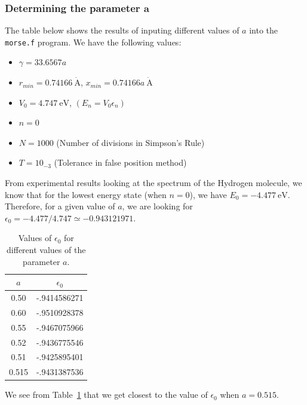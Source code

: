 \documentclass[a4paper]{IEEEtran}
\begin{document}
      \subsubsection{Determining the parameter $\mathbf{a}$}
      The table below shows the results of inputing different values of
      $a$ into the \verb+morse.f+ program. We have the following values:
      \begin{itemize}
            \item $\gamma = 33.6567a$
            \item $r_{min} = 0.74166 \: \mathrm{\dot{A}}$, 
                  $x_{min} = 0.74166a \: \mathrm{\dot{A}}$
            \item $V_0 = 4.747 \: \mathrm{eV}$, $(E_n = V_0\epsilon_n)$
            \item $n = 0$
            \item $N = 1000$ (Number of divisions in Simpson's Rule)
            \item $T = 10_{-3}$ (Tolerance in false position method)
      \end{itemize}
      From experimental results looking at the spectrum of the Hydrogen
      molecule, we know that for the lowest energy state (when $n=0$),
      we have $E_0 = -4.477 \: \mathrm{eV}$. Therefore, for a given
      value of $a$, we are looking for 
      $\epsilon_0 = -4.477/4.747 \simeq -0.943121971$.

      \begin{table}[h] 
      \caption{Values of $\epsilon_0$ for different values of the parameter $a$.}
      \label{tbl:epsilon-zero} 
      \begin{center}
      \begin{tabular}{|c|c|} \hline
      $a$ & $\epsilon_0$ \\ \hline \hline
      0.50  &     -.9414586271  \\
      0.60  &     -.9510928378  \\
      0.55  &     -.9467075966  \\
      0.52  &     -.9436775546  \\   
      0.51  &     -.9425895401  \\ 
      0.515 &     -.9431387536  \\ \hline 
      \end{tabular}
      \end{center}
      \end{table} 

      We see from Table~\ref{tbl:epsilon-zero} that we get closest to the value of
      $\epsilon_0$ when $a = 0.515$.
\end{document}
